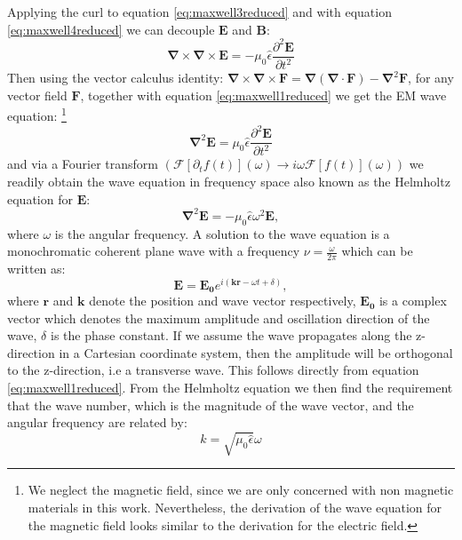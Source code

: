 Applying the curl to equation \ref{eq:maxwell3reduced} and with equation \ref{eq:maxwell4reduced} we can decouple $\bm{E}$ and $\bm{B}$: 
\begin{equation}
    \bm{\nabla}\times \bm{\nabla}\times \bm{E} = -\mu_0 \hat{\epsilon} \frac{\partial^2\bm{E}}{\partial t^2}
\end{equation}
Then using the vector calculus identity: $\bm{\nabla}\times \bm{\nabla}\times \bm{F} = \bm{\nabla} \left( \bm{\nabla} \cdot \bm{F} \right) - \bm{\nabla}^2 \bm{F}$, for any vector field $\bm{F}$, together with equation \ref{eq:maxwell1reduced} we get the EM wave equation: \footnote{We neglect the magnetic field, since we are only concerned with non magnetic materials in this work. Nevertheless, the derivation of the wave equation for the magnetic field looks similar to the derivation for the electric field.}
\begin{equation}
    \label{eq:waveeq}
    \bm{\nabla}^2 \bm{E} = \mu_0 \hat{\epsilon} \frac{\partial^2\bm{E}}{\partial t^2}
\end{equation}
and via a Fourier transform $(\mathcal{F}[\partial_t f(t)](\omega) \xrightarrow{} i\omega \mathcal{F}[f(t)](\omega))$ we readily obtain the wave equation in frequency space also known as the Helmholtz equation for $\bm{E}$:
\begin{equation}
    \label{eq:waveeqfreq}
    \bm{\nabla}^2 \bm{E} = -\mu_0 \hat{\epsilon} \omega^2 \bm{E},
\end{equation}
where $\omega$ is the angular frequency.
A solution to the wave equation is a monochromatic coherent plane wave with a frequency $\nu=\frac{\omega}{2\pi}$ which can be written as: 
\begin{equation}
    \label{eq:planewave}
    \bm{E} = \bm{E_0} e^{i(\bm{k}\bm{r} - \omega t + \delta)},
\end{equation}
where $\bm{r}$ and $\bm{k}$ denote the position and wave vector respectively, $\bm{E_0}$ is a complex vector which denotes the maximum amplitude and oscillation direction of the wave, $\delta$ is the phase constant. If we assume the wave propagates along the z-direction in a Cartesian coordinate system, then the amplitude will be orthogonal to the z-direction, i.e a transverse wave. This follows directly from equation \ref{eq:maxwell1reduced}. From the Helmholtz equation we then find the requirement that the wave number, which is the magnitude of the wave vector, and the angular frequency are related by:
\begin{equation}
    \label{eq:wavevector_req}
    k = \sqrt{\mu_0 \hat{\epsilon}} \omega
\end{equation}
